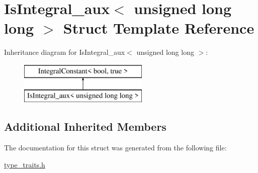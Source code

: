 \hypertarget{struct_is_integral__aux_3_01unsigned_01long_01long_01_4}{}\section{Is\+Integral\+\_\+aux$<$ unsigned long long $>$ Struct Template Reference}
\label{struct_is_integral__aux_3_01unsigned_01long_01long_01_4}
Inheritance diagram for Is\+Integral\+\_\+aux$<$ unsigned long long $>$\+:\begin{figure}[H]
\begin{center}
\leavevmode
\includegraphics[height=2.000000cm]{struct_is_integral__aux_3_01unsigned_01long_01long_01_4}
\end{center}
\end{figure}
\subsection*{Additional Inherited Members}


The documentation for this struct was generated from the following file\+:\begin{DoxyCompactItemize}
\item 
\hyperlink{type__traits_8h}{type\+\_\+traits.\+h}\end{DoxyCompactItemize}
